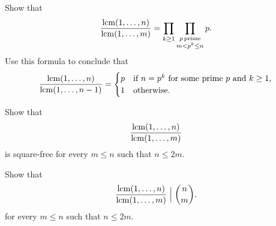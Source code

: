 \begin{routine}
\begin{subexenum}
  \item Show that
  \begin{equation*}
    \frac{\operatorname*{lcm}(1,\ldots,n)}{\operatorname*{lcm}(1,\ldots,m)} =
    \prod_{k\geq 1} \prod_{\substack{p\,\text{prime}\\m<p^k\leq n}}p.
  \end{equation*}
  Use this formula to conclude that
  \begin{equation*}
    \frac{\operatorname*{lcm}(1,\ldots,n)}{\operatorname*{lcm}(1,\ldots,n-1)} =
    \begin{cases}
      p & \text{if $n=p^k$ for some prime $p$ and $k\geq 1$,} \\
      1 & \text{otherwise.}
    \end{cases}
  \end{equation*}
  \item Show that
    \begin{equation*}
      \frac{\operatorname*{lcm}(1,\ldots,n)}{\operatorname*{lcm}(1,\ldots,m)}
    \end{equation*}
    is square-free for every $m\leq n$ such that $n\leq 2m$.
  \item Show that
    \begin{equation*}
      \frac{\operatorname*{lcm}(1,\ldots,n)}{\operatorname*{lcm}(1,\ldots,m)}\mathrel{\Big|}\binom{n}{m}.
    \end{equation*}
    for every $m\leq n$ such that $n\leq 2m$.
  \end{subexenum}
\end{routine}

